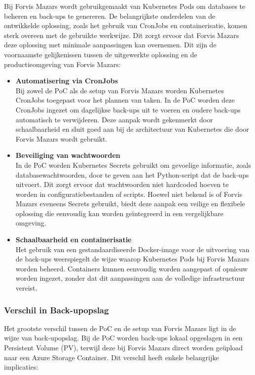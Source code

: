 Bij Forvis Mazars wordt gebruikgemaakt van Kubernetes Pods om databases te beheren en back-ups te genereren. De belangrijkste onderdelen van de ontwikkelde oplossing, zoals het gebruik van CronJobs en containerisatie, komen sterk overeen met de gebruikte werkwijze. Dit zorgt ervoor dat Forvis Mazars deze oplossing met minimale aanpassingen kan overnemen. Dit zijn de voornaamste gelijkenissen tussen de uitgewerkte oplossing en de productieomgeving van Forvis Mazars:

\begin{itemize}
    \item \textbf{Automatisering via CronJobs} \\
    Bij zowel de PoC als de setup van Forvis Mazars worden Kubernetes CronJobs toegepast voor het plannen van taken. In de PoC worden deze CronJobs ingezet om dagelijkse back-ups uit te voeren en oudere back-ups automatisch te verwijderen. Deze aanpak wordt gekenmerkt door schaalbaarheid en sluit goed aan bij de architectuur van Kubernetes die door Forvis Mazars wordt gebruikt.
    
    \item \textbf{Beveiliging van wachtwoorden} \\
    In de PoC worden Kubernetes Secrets gebruikt om gevoelige informatie, zoals databasewachtwoorden, door te geven aan het Python-script dat de back-ups uitvoert. Dit zorgt ervoor dat wachtwoorden niet hardcoded hoeven te worden in configuratiebestanden of scripts. Hoewel niet bekend is of Forvis Mazars eveneens Secrets gebruikt, biedt deze aanpak een veilige en flexibele oplossing die eenvoudig kan worden geïntegreerd in een vergelijkbare omgeving.
    
    \item \textbf{Schaalbaarheid en containerisatie} \\
    Het gebruik van een gestandaardiseerde Docker-image voor de uitvoering van de back-ups weerspiegelt de wijze waarop Kubernetes Pods bij Forvis Mazars worden beheerd. Containers kunnen eenvoudig worden aangepast of opnieuw worden ingezet, zonder dat dit aanpassingen aan de volledige infrastructuur vereist.
\end{itemize}


\subsubsection*{Verschil in Back-upopslag}

Het grootste verschil tussen de PoC en de setup van Forvis Mazars ligt in de wijze van back-upopslag. Bij de PoC worden back-ups lokaal opgeslagen in een Persistent Volume (PV), terwijl deze bij Forvis Mazars direct worden geüpload naar een Azure Storage Container. Dit verschil heeft enkele belangrijke implicaties:

